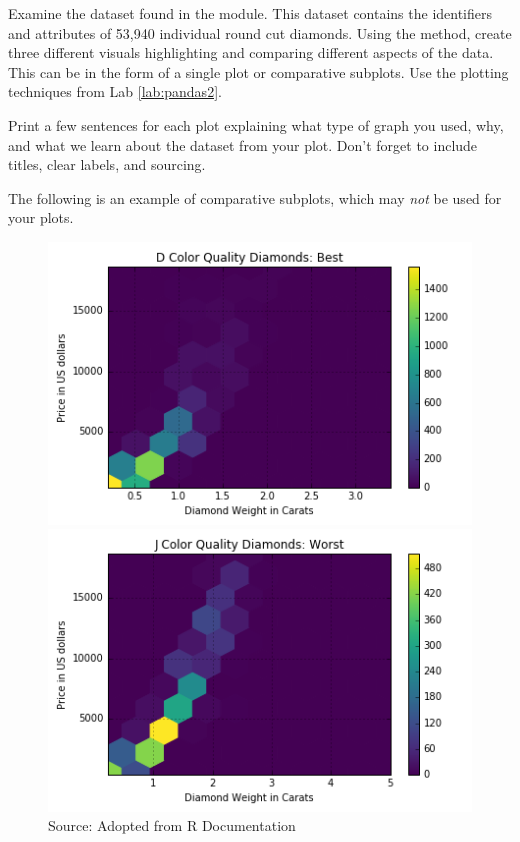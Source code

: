 \begin{problem} 
Examine the  dataset found in the  module. 
This dataset contains the identifiers and attributes of 53,940  individual round cut diamonds. 
Using the  method, create three different visuals highlighting and comparing different aspects of the data.
This can be in the form of a single plot or comparative subplots.  Use the plotting techniques from Lab \ref{lab:pandas2}.

Print a few sentences for each plot explaining what type of graph you used, why, and what we learn about the dataset from your plot.
Don't forget to include titles, clear labels, and sourcing. 

The following is an example of comparative subplots, which may \emph{not} be used for your plots.
\begin{figure}[H] %
    \centering
    \begin{minipage}[b]{0.48\textwidth}
    \includegraphics[width=\textwidth]{DiamondD.png}
    \end{minipage}
    \quad
    \begin{minipage}[b]{0.48\textwidth}
    \includegraphics[width=\textwidth]{DiamondJ.png}
    \end{minipage}
    \caption{Source: Adopted from R Documentation}
    \label{fig:intro2}
\end{figure}


\end{problem}
